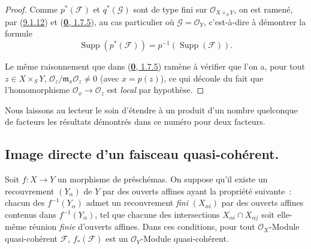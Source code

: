 \begin{proof}
Comme $p^*(\mathscr{F})$ et $q^*(\mathscr{G})$ sont de type fini sur
$\mathscr{O}_{X\times_S Y}$, on est ramené, par
(\hyperref[I.9.1.12-fr]{9.1.12}) et
(\hyperref[0.1.7.5-fr]{\textbf{0}, 1.7.5}), au cas particulier où
$\mathscr{G}=\mathscr{O}_Y$, c'est-à-dire à démontrer la formule
\[
  \operatorname{Supp}(p^*(\mathscr{F}))
  =p^{-1}(\operatorname{Supp}(\mathscr{F})).
  \tag{9.1.13.1}\label{I.9.1.13.1-fr}
\]

Le même raisonnement que dans (\hyperref[0.1.7.5-fr]{\textbf{0}, 1.7.5}) ramène à
vérifier que l'on a, pour tout $z\in X\times_S Y$,
$\mathscr{O}_z/\mathfrak{m}_x\mathscr{O}_z\neq0$ (avec $x=p(z)$), ce qui
découle du fait que l'homomorphisme
$\mathscr{O}_x\to\mathscr{O}_z$ est \emph{local} par hypothèse.
\end{proof}

Nous laissons au lecteur le soin d'étendre à un produit d'un nombre
quelconque de facteurs les résultats démontrés dans ce numéro pour deux
facteurs.

\subsection{Image directe d'un faisceau quasi-cohérent.}
\label{subsection:I.9.2-fr}

\begin{proposition}[9.2.1]
\label{I.9.2.1-fr}
Soit $f:X\to Y$ un morphisme de préschémas. On suppose qu'il existe un
recouvrement $(Y_\alpha)$ de $Y$ par des ouverts affines ayant la propriété
suivante~: chacun des $f^{-1}(Y_\alpha)$ admet un recouvrement \emph{fini}
$(X_{\alpha i})$ par des ouverts affines contenus dans
$f^{-1}(Y_\alpha)$, tel que chacune des intersections
$X_{\alpha i}\cap X_{\alpha j}$ soit elle-même réunion \emph{finie} d'ouverts
affines. Dans ces conditions, pour tout $\mathscr{O}_X$-Module
quasi-cohérent $\mathscr{F}$, $f_*(\mathscr{F})$ est un
$\mathscr{O}_Y$-Module quasi-cohérent.
\end{proposition}

